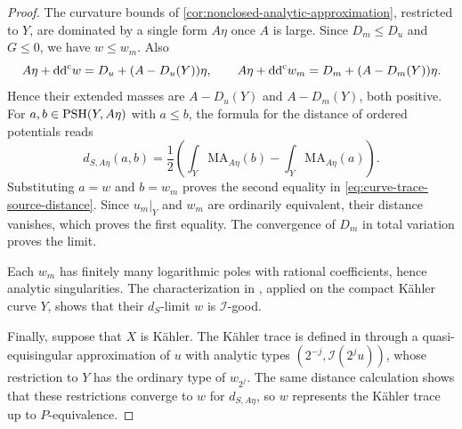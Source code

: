 \begin{proof}
The curvature bounds of \cref{cor:nonclosed-analytic-approximation}, restricted to $Y$, are dominated by a single form $A\eta$ once $A$ is large. Since $D_m\leq D_u$ and $G\leq0$, we have $w\leq w_m$. Also
\[
 A\eta+\mathrm{dd}^{\mathrm{c}} w=D_u+(A-D_u(Y))\eta,
 \qquad
 A\eta+\mathrm{dd}^{\mathrm{c}} w_m=D_m+(A-D_m(Y))\eta.
\]
Hence their extended masses are $A-D_u(Y)$ and $A-D_m(Y)$, both positive. For $a,b\in\mathrm{PSH}(Y,A\eta)$ with $a\leq b$, the formula for the distance of ordered potentials \cite[Lemma~6.2.2]{SGPT} reads
\[
 d_{S,A\eta}(a,b)
 =\frac12\left(\int_Y\mathrm{MA}_{A\eta}(b)
                   -\int_Y\mathrm{MA}_{A\eta}(a)\right).
\]
Substituting $a=w$ and $b=w_m$ proves the second equality in \eqref{eq:curve-trace-source-distance}. Since $u_m|_Y$ and $w_m$ are ordinarily equivalent, their distance vanishes, which proves the first equality. The convergence of $D_m$ in total variation proves the limit.

Each $w_m$ has finitely many logarithmic poles with rational coefficients, hence analytic singularities. The characterization in \cite[Theorem~7.1.1]{SGPT}, applied on the compact K\"ahler curve $Y$, shows that their $d_S$-limit $w$ is $\mathcal I$-good.

Finally, suppose that $X$ is K\"ahler. The K\"ahler trace is defined in \cite[Definition~8.1.1 and Proposition~8.1.2]{SGPT} through a quasi-equisingular approximation of $u$ with analytic types
$(2^{-j},\mathcal I(2^ju))$, whose restriction to $Y$ has the ordinary type of $w_{2^j}$. The same distance calculation shows that these restrictions converge to $w$ for $d_{S,A\eta}$, so $w$ represents the K\"ahler trace up to $P$-equivalence.
\end{proof}


